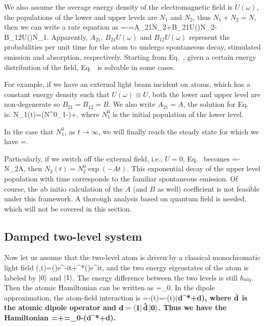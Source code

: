 We also assume the average energy density of the electromagnetic field is $U(\omega)$, the populations of the lower and upper levels are $N_1$ and $N_2$, thus $N_1+N_2=N$, then we can write a rate equation as
\bea
{}=-=A_{21}N_2+B_{21}U(\omega)N_2-B_{12}U(\omega)N_1.
\label{AB_RATE}
\eea
Apparently, $A_{21}$, $B_{21}U(\omega)$ and $B_{12}U(\omega)$ represent the probabilities per unit time for the atom to undergo spontaneous decay, stimulated emission and absorption, respectively. Starting from Eq.~, given a certain energy distribution of the field, Eq.~ is solvable in some cases.

For example, if we have an external light beam incident on atoms, which has a constant energy density such that $U(\omega)\equiv U$, both the lower and upper level are non-degenerate so $B_{21}=B_{12}=B$. We also write $A_{21}=A$, the solution for Eq.~ is:
\bea
N_1(t)=\left(N^0_1-\right)\exp{}+,
\eea
where $N^0_1$ is the initial population of the lower level.

In the case that $N^0_1$, as $t\to\infty$, we will finally reach the steady state for which we have
\bea
{}=.
\eea

Particularly, if we switch off the external field, i.e., $U=0$, Eq.~ becomes
\bea
{}=-N_2A,
\eea
then $N_2(t)=N^0_2\exp(-At)$. This exponential decay of the upper level population with time corresponds to the familiar spontaneous emission. Of course, the ab initio calculation of the $A$ (and $B$ as well) coefficient is not feasible under this framework. A thorough analysis based on quantum field is needed, which will not be covered in this section.

\subsection{Damped two-level system}
Now let us assume that the two-level atom is driven by a classical monochromatic light field
\bea
\bE(\br,t)=\cbE(\br)e^{-i\omega t}+\cbE^*(\br)e^{i\omega t},
\eea
and the two energy eigenstates of the atom is labeled by $\left| 0 \right\rangle$ and $\left| 1 \right\rangle$. The energy difference between the two levels is still $\hbar\omega_0$. Then the atomic Hamiltonian can be written as
\bea
{}=\omega_0.
\eea
In the dipole approximation, the atom-field interaction is
\bea
{}=-\cdot\bE(t)=-\bE(t)\cdot\left(\bf{d}^*+\bf{d}\right),
\eea
where $\hat{\bf{d}}$ is the atomic dipole operator and $\bf{d}=\left\langle 1 \right|\hat{\bf{d}}\left| 0 \right\rangle$. Thus we have the Hamiltonian
\bea
{}=+=\omega_0-\cdot\left(\bf{d}^*+\bf{d}\right).
\eea

